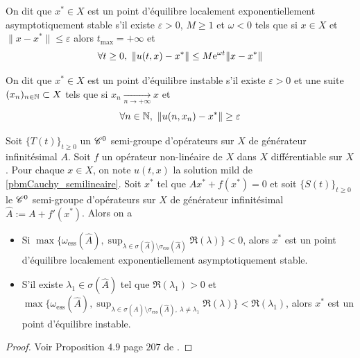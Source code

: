 \begin{definition}
    On dit que $x^* \in X$ est un \textcolor{astral}{point d'équilibre localement exponentiellement asymptotiquement stable} s'il existe $\varepsilon >0$, $M \geq 1$ et $\omega <0$ tels que si $x \in X$ et $\|x-x^*\| \leq \varepsilon$ alors $t_{\max}=+\infty$ et 
    \begin{equation*}
        \forall t \geq 0, \ \|u(t,x)-x^*\| \leq M\mathrm{e}^{\omega t}\|x-x^*\|
    \end{equation*}
\end{definition}

\begin{definition}
    On dit que $x^* \in X$ est un \textcolor{astral}{point d'équilibre instable} s'il existe $\varepsilon >0$ et une suite $(x_n)_{n \in \mathbb{N}} \subset X$ tels que si $x_n \underset{n \to +\infty}{\longrightarrow}x$ et 
    \begin{equation*}
        \forall n \in \mathbb{N}, \ \|u(n,x_n) - x^*\| \geq \varepsilon
    \end{equation*}
\end{definition}

\begin{proposition}\label{prop_stab_pts_equilibre}
    Soit $\big\{T(t)\big\}_{t \geq 0}$ un $\mathscr{C}^0$ semi-groupe d'opérateurs sur $X$ de générateur infinitésimal $A$. Soit $f$ un opérateur non-linéaire de $X$ dans $X$ différentiable sur $X$. Pour chaque $x \in X$, on note $u(t,x)$ la solution mild de \eqref{pbmCauchy_semilineaire}. Soit $x^*$ tel que $Ax^*+f(x^*)=0$ et soit $\big\{S(t)\big\}_{t\geq 0}$ le $\mathscr{C}^0$ semi-groupe d'opérateurs sur $X$ de générateur infinitésimal $\hat{A}:=A+f'(x^*)$. Alors on a 
    \begin{itemize}
        \item Si $\max\{\omega_{\text{ess}}(\hat{A}), \displaystyle{\sup_{\lambda \in \sigma(\hat{A})\setminus \sigma_{\text{ess}}(\hat{A})}}\Re(\lambda)\}<0$, alors $x^*$ est un point d'équilibre localement exponentiellement asymptotiquement stable.
        \item S'il existe $\lambda_1 \in \sigma(\hat{A})$ tel que $\Re(\lambda_1) >0$ et $\max\{\omega_{\text{ess}}(\hat{A}), \displaystyle{\sup_{\lambda \in \sigma(\hat{A})\setminus \sigma_{\text{ess}}(\hat{A}), \ \lambda \neq \lambda_1}}\Re(\lambda)\}<\Re(\lambda_1)$, alors $x^*$ est un point d'équilibre instable.
    \end{itemize}
\end{proposition}

\begin{proof}
    Voir Proposition $4.9$ page $207$ de \cite{Webb1985}.
\end{proof}